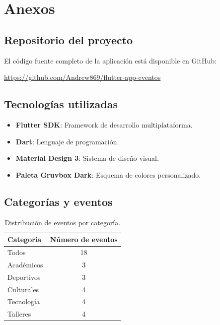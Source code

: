 \documentclass[12pt, a4paper]{article}
\begin{document}
\section{Anexos}

\subsection{Repositorio del proyecto}

El código fuente completo de la aplicación está disponible en GitHub:

\url{https://github.com/Andrew869/flutter-app-eventos}

\subsection{Tecnologías utilizadas}

\begin{itemize}[noitemsep]
    \item \textbf{Flutter SDK}: Framework de desarrollo multiplataforma.
    \item \textbf{Dart}: Lenguaje de programación.
    \item \textbf{Material Design 3}: Sistema de diseño visual.
    \item \textbf{Paleta Gruvbox Dark}: Esquema de colores personalizado.
\end{itemize}

\subsection{Categorías y eventos}

\begin{table}[h!]
    \centering
    \begin{tabular}{|l|c|}
        \hline
        \textbf{Categoría} & \textbf{Número de eventos} \\
        \hline
        Todos & 18 \\
        Académicos & 3 \\
        Deportivos & 3 \\
        Culturales & 4 \\
        Tecnología & 4 \\
        Talleres & 4 \\
        \hline
    \end{tabular}
    \caption{Distribución de eventos por categoría.}
    \label{tab:eventos}
\end{table}
\end{document}
